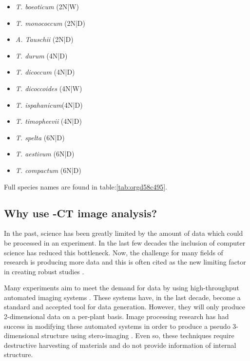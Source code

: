 \documentclass[11pt]{report}
\begin{document}
\begin{multicols}{3}

  \begin{itemize}
  \item{\textit{T. boeoticum} (2N|W)}
  \item{\textit{T. monococcum} (2N|D)}
  \item{\textit{A. Tauschii} (2N|D)}
  \end{itemize}

  \columnbreak

  \begin{itemize}
  \item{\textit{T. durum} (4N|D)}
  \item{\textit{T. dicoccum} (4N|D)}
  \item{\textit{T. dicoccoides} (4N|W)}
  \item{\textit{T. ispahanicum}(4N|D)}
  \item{\textit{T. timopheevii} (4N|D)}
  \end{itemize}

  \columnbreak

  \begin{itemize}
  \item{\textit{T. spelta} (6N|D)}
  \item{\textit{T. aestivum} (6N|D)}
  \item{\textit{T. compactum} (6N|D)}
  \end{itemize}

\end{multicols}
Full species names are found in table:\ref{tab:orgd58c495}.

\subsection{Why use \textmu{}-CT image analysis?}
\label{sec:org7400314}
In the past, science has been greatly limited by the amount of data which could be processed in an experiment. In the last few decades the inclusion of computer science has reduced this bottleneck. Now, the challenge for many fields of research is producing more data and this is often cited as the new limiting factor in creating robust studies \cite{Furbank2011}.

Many experiments aim to meet the demand for data by using high-throughput automated imaging systems \cite{Naumann2007,Prasanna2013,Humplik2015}. These systems have, in the last decade, become a standard and accepted tool for data generation. However, they will only produce 2-dimensional data on a per-plant basis. Image processing research has had success in modifying these automated systems in order to produce a pseudo 3-dimensional structure using stero-imaging \cite{Roussel2016}. Even so, these techniques require destructive harvesting of materials and do not provide information of internal structure.
\end{document}
